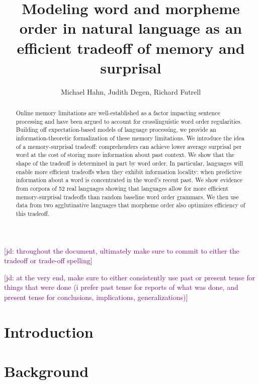 \documentclass[11pt,letterpaper]{article}
\title{Modeling word and morpheme order in natural language as an efficient tradeoff of memory and surprisal}
\author{Michael Hahn, Judith Degen, Richard Futrell}
\newcommand{\jd}[1]{\textcolor{Purple}{[jd: #1]}}
\newcommand\jd[1]{{\color{red}(#1)}}
\begin{document}
\maketitle


\begin{abstract}
Online memory limitations are well-established as a factor impacting sentence processing and have been argued to account for crosslinguistic word order regularities. Building off expectation-based models of language processing, we provide an information-theoretic formalization of these memory limitations. We introduce the idea of a memory-surprisal tradeoff: comprehenders can achieve lower average surprisal per word at the cost of storing more information about past context. We show that the shape of the tradeoff is determined in part by word order. In particular, languages will enable more efficient tradeoffs when they exhibit information locality: when predictive information about a word is concentrated in the word’s recent past. We show evidence from corpora of 52 real languages showing that languages allow for more efficient memory-surprisal tradeoffs than random baseline word order grammars. 
We then use data from two agglutinative languages that morpheme order also optimizes efficiency of this tradeoff.
\end{abstract}


% 

 \jd{throughout the document, ultimately make sure to commit to either the tradeoff or trade-off spelling}
 
 \jd{at the very end, make sure to either consistently use past or present tense for things that were done (i prefer past tense for reports of what was done, and present tense for conclusions, implications, generalizations)}
 
\section{Introduction}





\section{Background}\label{sec:background}
\end{document}
